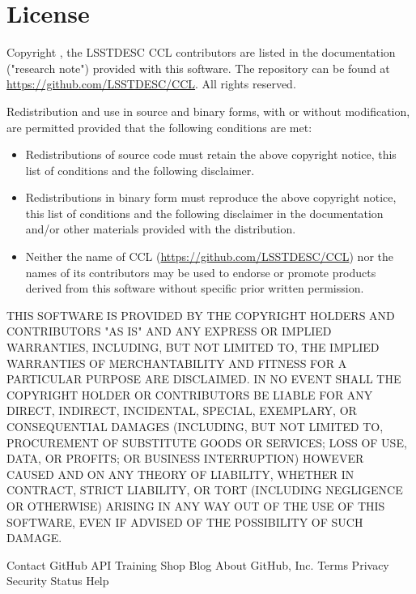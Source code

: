 \documentclass[\docopts]{\docclass}
\begin{document}
\section{License}
\label{sec:license}

Copyright , the LSSTDESC CCL contributors are listed in the
documentation ("research note") provided with this software. The repository can be found at \url{https://github.com/LSSTDESC/CCL}. All rights reserved.

Redistribution and use in source and binary forms, with or without
modification, are permitted provided that the following conditions are met:

\begin{itemize}
\item Redistributions of source code must retain the above copyright notice, this
  list of conditions and the following disclaimer.
\item Redistributions in binary form must reproduce the above copyright notice,
  this list of conditions and the following disclaimer in the documentation
  and/or other materials provided with the distribution.
\item Neither the name of CCL (\url{https://github.com/LSSTDESC/CCL}) nor the names of its
  contributors may be used to endorse or promote products derived from
  this software without specific prior written permission.
\end{itemize}

THIS SOFTWARE IS PROVIDED BY THE COPYRIGHT HOLDERS AND CONTRIBUTORS "AS IS"
AND ANY EXPRESS OR IMPLIED WARRANTIES, INCLUDING, BUT NOT LIMITED TO, THE
IMPLIED WARRANTIES OF MERCHANTABILITY AND FITNESS FOR A PARTICULAR PURPOSE ARE
DISCLAIMED. IN NO EVENT SHALL THE COPYRIGHT HOLDER OR CONTRIBUTORS BE LIABLE
FOR ANY DIRECT, INDIRECT, INCIDENTAL, SPECIAL, EXEMPLARY, OR CONSEQUENTIAL
DAMAGES (INCLUDING, BUT NOT LIMITED TO, PROCUREMENT OF SUBSTITUTE GOODS OR
SERVICES; LOSS OF USE, DATA, OR PROFITS; OR BUSINESS INTERRUPTION) HOWEVER
CAUSED AND ON ANY THEORY OF LIABILITY, WHETHER IN CONTRACT, STRICT LIABILITY,
OR TORT (INCLUDING NEGLIGENCE OR OTHERWISE) ARISING IN ANY WAY OUT OF THE USE
OF THIS SOFTWARE, EVEN IF ADVISED OF THE POSSIBILITY OF SUCH DAMAGE.

Contact GitHub API Training Shop Blog About  GitHub, Inc. Terms Privacy Security Status Help





\end{document}
